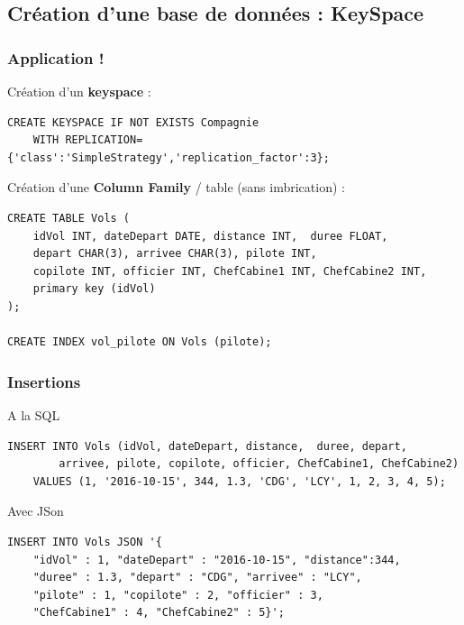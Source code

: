 \subsection[KeySpace]{Création d'une base de données : KeySpace}

\begin{frame}[fragile]
	\frametitle{Application !}
	
	Création d'un \textbf{keyspace} :
\footnotesize
\begin{verbatim}
CREATE KEYSPACE IF NOT EXISTS Compagnie 
    WITH REPLICATION={'class':'SimpleStrategy','replication_factor':3};
\end{verbatim}
\normalsize

	\vfill
	
Création d'une \textbf{Column Family} / table (sans imbrication) :
\footnotesize
\begin{verbatim}
CREATE TABLE Vols (
    idVol INT, dateDepart DATE, distance INT,  duree FLOAT,
    depart CHAR(3), arrivee CHAR(3), pilote INT, 
    copilote INT, officier INT, ChefCabine1 INT, ChefCabine2 INT,
    primary key (idVol) 
);

CREATE INDEX vol_pilote ON Vols (pilote);
\end{verbatim}
\normalsize
\vfill
\end{frame}


\begin{frame}[fragile]
	\frametitle{Insertions}
	
	A la SQL

\footnotesize
\begin{verbatim}
INSERT INTO Vols (idVol, dateDepart, distance,  duree, depart,
        arrivee, pilote, copilote, officier, ChefCabine1, ChefCabine2)
    VALUES (1, '2016-10-15', 344, 1.3, 'CDG', 'LCY', 1, 2, 3, 4, 5);
\end{verbatim}
\normalsize
	
	\vfill
	
	Avec JSon
\footnotesize

\begin{verbatim}
INSERT INTO Vols JSON '{
    "idVol" : 1, "dateDepart" : "2016-10-15", "distance":344, 
    "duree" : 1.3, "depart" : "CDG", "arrivee" : "LCY", 
    "pilote" : 1, "copilote" : 2, "officier" : 3,
    "ChefCabine1" : 4, "ChefCabine2" : 5}';
\end{verbatim}
\end{frame}



